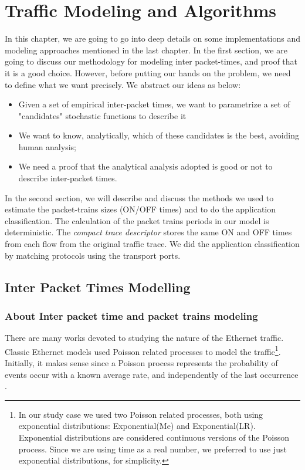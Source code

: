 \chapter{Traffic Modeling and Algorithms}\label{ch:modeling-evaluation}


In this chapter, we are going to go into deep details on some implementations and modeling approaches mentioned in the last chapter. In the first section, we are going to discuss our methodology for modeling inter packet-times, and proof that it is a good choice. However, before putting our hands on the problem, we need to define what we want precisely. We abstract our ideas as below:

\begin{itemize}    
    \item Given a set of empirical inter-packet times, we want to parametrize  a set of "candidates" stochastic functions to describe it
    \item We want to know, analytically,  which of these candidates is the best, avoiding human analysis;
    \item We need a proof that the analytical analysis adopted is good or not to describe inter-packet times.
\end{itemize}

In the second section, we will describe and discuss the methods we used to estimate the packet-trains sizes (ON/OFF times) and to do the application classification. The calculation of the packet trains periods in our model is deterministic. The \textit{compact trace descriptor} stores the same ON and OFF times from each flow from the original traffic trace. We did the application classification by matching protocols using the transport ports.

\section{Inter Packet Times Modelling}

\subsection{About Inter packet time and packet trains modeling}

There are many works devoted to studying the nature of the Ethernet traffic\cite{selfsimilar-ethernet}. Classic Ethernet models used Poisson related processes to model the traffic\footnote{In our study case we used two Poisson related processes, both using exponential distributions: Exponential(Me) and Exponential(LR). Exponential distributions are considered continuous versions of the Poisson process.  Since we are using time as a real number, we preferred to use just exponential distributions, for simplicity.}. Initially, it makes sense since a Poisson process represents the probability of events occur with a known average rate, and independently of the last occurrence\cite{selfsimilar-ethernet} \cite{book-poisson}. 

